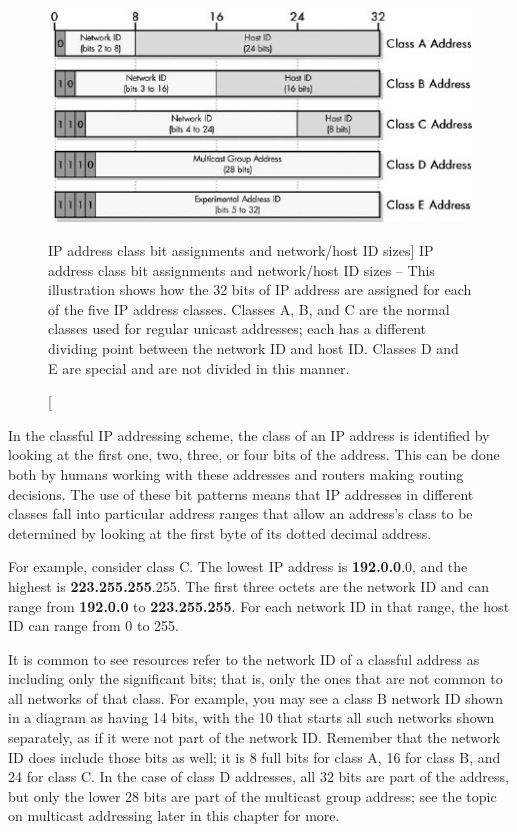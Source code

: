 \begin{figure}
   \centering
   \includegraphics[width=.7\textwidth]{images/ip-class-bits.jpg}
   \caption
      [IP address class bit assignments and network/host ID sizes]
      {IP address class bit assignments and network/host ID sizes --
      This illustration shows how the 32 bits of IP address are assigned for each of the five IP address classes.
      Classes A, B, and C are the normal classes used for regular unicast addresses; each has a different dividing point between the network ID and host ID.
      Classes D and E are special and are not divided in this manner.}
   \label{fig:ip-class-bits}
\end{figure}


\begin{keyconcept}
In the classful IP addressing scheme, the class of an IP address is identified by looking at the first one, two, three, or four bits of the address.
This can be done both by humans working with these addresses and routers making routing decisions.
The use of these bit patterns means that IP addresses in different classes fall into particular address ranges that allow an address's class to be
determined by looking at the first byte of its dotted decimal address.
\end{keyconcept}


For example, consider class C.
The lowest IP address is \textbf{192.0.0}.0, and the highest is \textbf{223.255.255}.255.
The first three octets are the network ID and can range from \textbf{192.0.0} to \textbf{223.255.255}.
For each network ID in that range, the host ID can range from 0 to 255.

\begin{note}
It is common to see resources refer to the network ID of a classful address as including only the significant bits; that is, only
the ones that are not common to all networks of that class.
For example, you may see a class B network ID shown in a diagram as having 14 bits, with the 10 that starts all such networks shown separately, as if it
were not part of the network ID.
Remember that the network ID does include those bits as well; it is 8 full bits for class A, 16 for class B, and 24 for class C.
In the case of class D addresses, all 32 bits are part of the address, but only the lower 28 bits are part of the
multicast group address; see the topic on multicast addressing later in this chapter for more.
\end{note}


